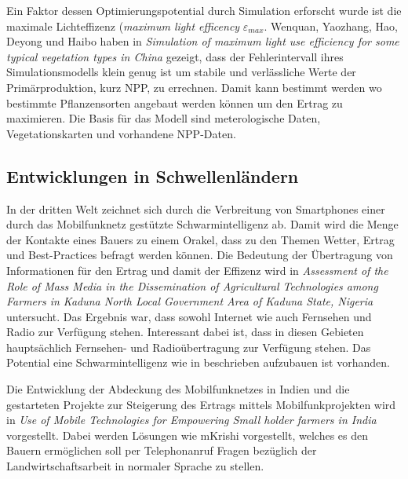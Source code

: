 Ein Faktor dessen Optimierungspotential durch Simulation erforscht wurde ist die maximale Lichteffizenz (\textit{maximum light efficency} $\varepsilon_{max}$. Wenquan, Yaozhang, Hao, Deyong und Haibo haben in \textit{Simulation of maximum light use efficiency for some typical vegetation types in China} gezeigt, dass der Fehlerintervall ihres Simulationsmodells klein genug ist um stabile und verlässliche Werte der Primärproduktion, kurz NPP, zu errechnen.  Damit kann bestimmt werden wo bestimmte Pflanzensorten angebaut werden können um den Ertrag zu maximieren. Die Basis für das Modell sind meterologische Daten, Vegetationskarten und vorhandene NPP-Daten.  \cite{jour:Zhu2006}

\subsection{Entwicklungen in Schwellenländern}

In der dritten Welt zeichnet sich durch die Verbreitung von Smartphones einer durch das Mobilfunknetz gestützte Schwarmintelligenz ab. Damit wird die Menge der Kontakte eines Bauers zu einem Orakel, dass zu den Themen Wetter, Ertrag und Best-Practices befragt werden können.\cite{jour:Razaque2013} Die Bedeutung der Übertragung von Informationen für den Ertrag und damit der Effizenz wird in \textit{Assessment of the Role of Mass Media in the Dissemination of Agricultural Technologies among Farmers in Kaduna North Local Government Area of Kaduna State, Nigeria} untersucht. Das Ergebnis war, dass sowohl Internet wie auch Fernsehen und Radio zur Verfügung stehen. Interessant dabei ist, dass in diesen Gebieten hauptsächlich Fernsehen- und Radioübertragung zur Verfügung stehen. Das Potential eine Schwarmintelligenz wie in \cite{jour:razaque2013} beschrieben aufzubauen ist vorhanden.\cite{jour:State2013}

Die Entwicklung der Abdeckung des Mobilfunknetzes in Indien und die gestarteten Projekte zur Steigerung des Ertrags mittels Mobilfunkprojekten wird in \textit{Use of Mobile Technologies for Empowering Small holder farmers in India} vorgestellt. Dabei werden Lösungen wie mKrishi vorgestellt, welches es den Bauern ermöglichen soll per Telephonanruf Fragen bezüglich der Landwirtschaftsarbeit in normaler Sprache zu stellen. \cite{article:Kokate2013}

